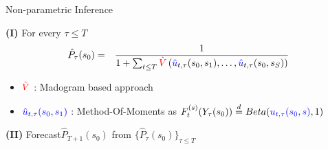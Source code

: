 \documentclass[9pt,compress]{beamer}
\begin{document}
\begin{frame}{Non-parametric Inference}  

\begin{tcolorbox}[title= A plug-in strategy  ]
\textbf{(I)} For every $\tau\leq T$
		\begin{eqnarray*} \label{eq:modelP}
			\hat{P}_{\tau}(s_0)  &=& \frac{1}{1 + \sum_{t\leq T} {\color{red} \hat V}\left({\color{blue} \hat u}_{t,\tau}(s_0,s_1), \ldots,  {\color{blue} \hat u}_{t,\tau}(s_0,s_S)\right) }
\end{eqnarray*} 
\medskip
	\begin{itemize}
		\item $ {\color{red}\hat V}$ : Madogram based approach\footnotemark[10] 
		\item $ {\color{blue}\hat u_{t,\tau}(s_0,s_1)}$ : Method-Of-Moments as $F_t^{(s)}(Y_{\tau}(s_0)) \stackrel{d}{=}  Beta( {\color{blue} u_{t,\tau}(s_0,s)}, 1)$
	\end{itemize}
	\bigskip 
	\bigskip 
	
	\textbf{(II)} Forecast\footnotemark[11]  $\hat{P}_{T+1}(s_0)$ from $\{\hat{P}_{\tau}(s_0)\}_{\tau\leq T}$ \\
\end{tcolorbox}

\end{frame}
\end{document}
